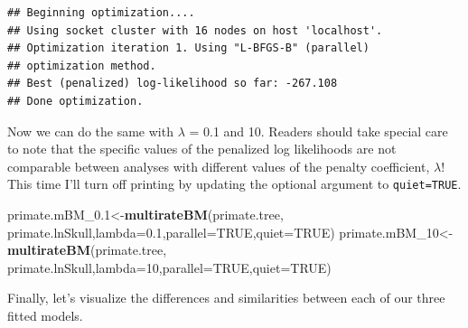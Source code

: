 \documentclass[fleqn,10pt,lineno]{wlpeerj} %
\newenvironment{Shaded}{\begin{snugshade}}{\end{snugshade}}
\newcommand{\AttributeTok}[1]{\textcolor[rgb]{0.13,0.29,0.53}{#1}}
\newcommand{\ConstantTok}[1]{\textcolor[rgb]{0.56,0.35,0.01}{#1}}
\newcommand{\DecValTok}[1]{\textcolor[rgb]{0.00,0.00,0.81}{#1}}
\newcommand{\FloatTok}[1]{\textcolor[rgb]{0.00,0.00,0.81}{#1}}
\newcommand{\FunctionTok}[1]{\textcolor[rgb]{0.13,0.29,0.53}{\textbf{#1}}}
\newcommand{\NormalTok}[1]{#1}
\newcommand{\OtherTok}[1]{\textcolor[rgb]{0.56,0.35,0.01}{#1}}
\begin{document}
\begin{verbatim}
## Beginning optimization....
## Using socket cluster with 16 nodes on host 'localhost'.
## Optimization iteration 1. Using "L-BFGS-B" (parallel) 
## optimization method.
## Best (penalized) log-likelihood so far: -267.108 
## Done optimization.
\end{verbatim}

Now we can do the same with \(\lambda\) = 0.1 and 10. Readers should take special care to note that the specific values of the penalized log likelihoods are not comparable between analyses with different values of the penalty coefficient, \(\lambda\)! This time I'll turn off printing by updating the optional argument to \texttt{quiet=TRUE}.

\begin{Shaded}
\begin{Highlighting}[]
\NormalTok{primate.mBM\_0}\FloatTok{.1}\OtherTok{\textless{}{-}}\FunctionTok{multirateBM}\NormalTok{(primate.tree,}
\NormalTok{  primate.lnSkull,}\AttributeTok{lambda=}\FloatTok{0.1}\NormalTok{,}\AttributeTok{parallel=}\ConstantTok{TRUE}\NormalTok{,}\AttributeTok{quiet=}\ConstantTok{TRUE}\NormalTok{)}
\NormalTok{primate.mBM\_10}\OtherTok{\textless{}{-}}\FunctionTok{multirateBM}\NormalTok{(primate.tree,}
\NormalTok{  primate.lnSkull,}\AttributeTok{lambda=}\DecValTok{10}\NormalTok{,}\AttributeTok{parallel=}\ConstantTok{TRUE}\NormalTok{,}\AttributeTok{quiet=}\ConstantTok{TRUE}\NormalTok{)}
\end{Highlighting}
\end{Shaded}

Finally, let's visualize the differences and similarities between each of our three fitted models.
\end{document}
